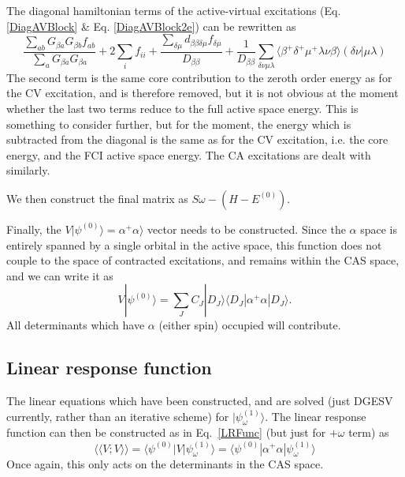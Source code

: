 \documentclass[a4paper,oneside,11pt]{article}
\numberwithin{equation}{section}
\begin{document}
The diagonal hamiltonian terms of the active-virtual excitations (Eq. \ref{DiagAVBlock} \& Eq. \ref{DiagAVBlock2e}) can be rewritten as
\begin{equation}
\frac{\sum_{ab} G_{\beta a} G_{\beta b} f_{ab}}{\sum_a G_{\beta a} G_{\beta a}} + 2 \sum_i f_{ii} + \frac{\sum_{\delta \mu} d_{\beta \beta \delta \mu} f_{\delta \mu}}{D_{\beta \beta}} + \frac{1}{D_{\beta \beta}} \sum_{\delta \nu \mu \lambda} \langle \beta^{+} \delta^{+} \mu^{+} \lambda \nu \beta \rangle (\delta \nu | \mu \lambda)
\end{equation}
The second term is the same core contribution to the zeroth order energy as for the CV excitation, and is therefore removed, but it is not obvious at the moment whether the last two terms reduce to 
the full active space energy. This is something to consider further, but for the moment, the energy which is subtracted from the diagonal is the same as for the CV excitation, i.e. the core energy, and the 
FCI active space energy. The CA excitations are dealt with similarly.

We then construct the final matrix as $S\omega - (H-E^{(0)})$.

Finally, the $V|\psi^{(0)} \rangle = \alpha^{+} \alpha \rangle$ vector needs to be constructed. 
Since the $\alpha$ space is entirely spanned by a single orbital in the active space, this function does not couple
to the space of contracted excitations, and remains within the CAS space, and we can write it as
\begin{equation}
V|\psi^{(0)} \rangle = \sum_J C_J |D_J \rangle \langle D_J | \alpha^{+} \alpha | D_J \rangle    .
\end{equation}
All determinants which have $\alpha$ (either spin) occupied will contribute.

\subsection{Linear response function}
The linear equations which have been constructed, and are solved (just DGESV currently, rather than an iterative scheme) for $|\psi^{(1)}_{\omega} \rangle$. The linear response function can then be
constructed as in Eq.~\ref{LRFunc} (but just for $+\omega$ term) as
\begin{equation}
\langle \langle V ; V \rangle \rangle = \langle \psi^{(0)} | V | \psi^{(1)}_{\omega} \rangle = \langle \psi^{(0)} | \alpha^{+} \alpha | \psi^{(1)}_{\omega} \rangle
\end{equation}
Once again, this only acts on the determinants in the CAS space.
\end{document}
